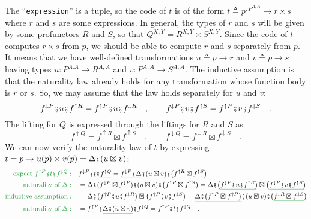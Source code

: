 The \textsf{``}\lstinline!expression!\textsf{''} is a tuple, so the code of $t$
is of the form $t\triangleq p^{:P^{A,A}}\rightarrow r\times s$ where
$r$ and $s$ are some expressions. In general, the types of $r$
and $s$ will be given by some profunctors $R$ and $S$, so that
$Q^{X,Y}=R^{X,Y}\times S^{X,Y}$. Since the code of $t$ computes
$r\times s$ from $p$, we should be able to compute $r$ and $s$
separately from $p$. It means that we have well-defined transformations
$u\triangleq p\rightarrow r$ and $v\triangleq p\rightarrow s$ having
types $u:P^{A.A}\rightarrow R^{A,A}$ and $v:P^{A,A}\rightarrow S^{A,A}$.
The inductive assumption is that the naturality law already holds
for any transformation whose function body is $r$ or $s$. So, we
may assume that the law holds separately for $u$ and $v$:
\[
f^{\downarrow P}\bef u\bef f^{\uparrow R}=f^{\uparrow P}\bef u\bef f^{\downarrow R}\quad,\quad\quad f^{\downarrow P}\bef v\bef f^{\uparrow S}=f^{\uparrow P}\bef v\bef f^{\downarrow S}\quad.
\]
The lifting for $Q$ is expressed through the liftings for $R$ and
$S$ as
\[
f^{\uparrow Q}=f^{\uparrow R}\boxtimes f^{\uparrow S}\quad,\quad\quad f^{\downarrow Q}=f^{\downarrow R}\boxtimes f^{\downarrow S}\quad.
\]
We can now verify the naturality law of $t$ by expressing $t=p\rightarrow u(p)\times v(p)=\Delta\bef(u\boxtimes v)$:
\begin{align*}
{\color{greenunder}\text{expect }f^{\uparrow P}\bef t\bef f^{\downarrow Q}:}\quad & f^{\downarrow P}\bef\gunderline t\bef\gunderline{f^{\uparrow Q}}=\gunderline{f^{\downarrow P}\bef\Delta}\bef(u\boxtimes v)\bef\big(f^{\uparrow R}\boxtimes f^{\uparrow S}\big)\\
{\color{greenunder}\text{naturality of }\Delta:}\quad & =\Delta\bef(f^{\downarrow P}\boxtimes f^{\downarrow P})\bef(u\boxtimes v)\bef\big(f^{\uparrow R}\boxtimes f^{\uparrow S}\big)=\Delta\bef\big(\gunderline{f^{\downarrow P}\bef u\bef f^{\uparrow R}}\big)\boxtimes\big(\gunderline{f^{\downarrow P}\bef v\bef f^{\uparrow S}}\big)\\
{\color{greenunder}\text{inductive assumption}:}\quad & =\Delta\bef\big(f^{\uparrow P}\bef u\bef f^{\downarrow R}\big)\boxtimes\big(f^{\uparrow P}\bef v\bef f^{\downarrow S}\big)=\gunderline{\Delta\bef\big(f^{\uparrow P}\boxtimes f^{\uparrow P}\big)}\bef(u\boxtimes v)\bef\big(\gunderline{f^{\downarrow R}\boxtimes f^{\downarrow S}}\big)\\
{\color{greenunder}\text{naturality of }\Delta:}\quad & =f^{\uparrow P}\bef\gunderline{\Delta\bef(u\boxtimes v)}\bef f^{\downarrow Q}=f^{\uparrow P}\bef t\bef f^{\downarrow Q}\quad.
\end{align*}


